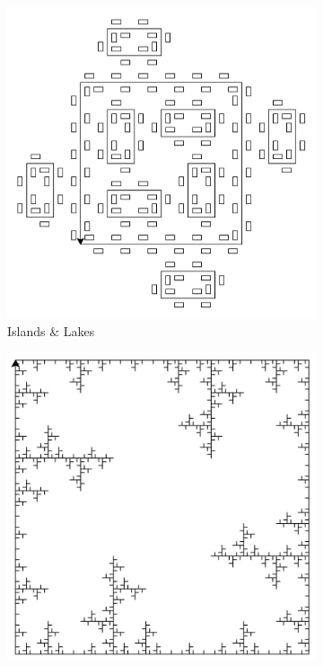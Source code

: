 \documentclass[12pt,twoside]{reedthesis}
\begin{document}
	\begin{figure}[h]
	\begin{subfigure}{0.5\textwidth}
		\centering
		\includegraphics[height = 0.85\textwidth]{Images/TurtleGraphics4}
		\caption{Islands \& Lakes\footnotemark}
		\label {TurtleGraphics4}
	\end{subfigure}%
	\begin{subfigure}{0.5\textwidth}
		\centering
		\includegraphics[height = 0.85\textwidth]{Images/TurtleGraphics5}

\end{subfigure}
\end{figure}
\end{document}
